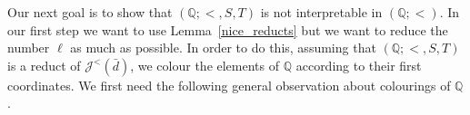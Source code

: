\documentclass{amsart}
\theoremstyle{definition}
\newtheorem{theorem}{Theorem}[section]
\theoremstyle{remark}
\numberwithin{equation}{section}
\newcommand\red[1]{\textcolor{red}{#1}}
\newcommand\johnord[1]{\mathcal{J}^{<}(#1)}
\newcommand{\fb}{\mathfrak{B}}
\begin{document}

	

	
	Our next goal is to show that $(\mathbb{Q};<,S,T)$ is not interpretable in $(\mathbb{Q};<)$. In our first step we want to use Lemma~\ref{nice_reducts} but we want to reduce the number $\ell$ as much as possible. In order to do this, assuming that $(\mathbb{Q};<,S,T)$ is a reduct of $\johnord{\bar{d}}$, we colour the elements of $\mathbb{Q}$ according to their first coordinates. We first need the following general observation about colourings of $\mathbb{Q}$.
	
\end{document}
